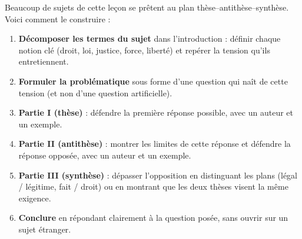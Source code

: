 \documentclass[11pt]{article}
\begin{document}
\begin{methode}
Beaucoup de sujets de cette leçon se prêtent au plan thèse--antithèse--synthèse. Voici comment le construire :
\begin{enumerate}
\item \textbf{Décomposer les termes du sujet} dans l'introduction : définir chaque notion clé (droit, loi, justice, force, liberté) et repérer la tension qu'ils entretiennent.
\item \textbf{Formuler la problématique} sous forme d'une question qui naît de cette tension (et non d'une question artificielle).
\item \textbf{Partie I (thèse)} : défendre la première réponse possible, avec un auteur et un exemple.
\item \textbf{Partie II (antithèse)} : montrer les limites de cette réponse et défendre la réponse opposée, avec un auteur et un exemple.
\item \textbf{Partie III (synthèse)} : dépasser l'opposition en distinguant les plans (légal / légitime, fait / droit) ou en montrant que les deux thèses visent la même exigence.
\item \textbf{Conclure} en répondant clairement à la question posée, sans ouvrir sur un sujet étranger.
\end{enumerate}
\end{methode}
\end{document}
